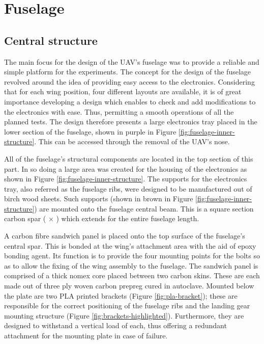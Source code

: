 \documentclass[../../main.tex]{subfiles}
\begin{document}

\section{Fuselage} \label{sec:final-design-proposal:fuselage}

\subsection{Central structure} \label{sec:final-design-proposal:fuselage:central-structure}

The main focus for the design of the UAV's fuselage was to provide a reliable and simple platform for the experiments.
The concept for the design of the fuselage revolved around the idea of providing easy access to the electronics.
Considering that for each wing position, four different layouts are available, it is of great importance developing a design which enables to check and add modifications to the electronics with ease.
Thus, permitting a smooth operations of all the planned tests.
The design therefore presents a large electronics tray placed in the lower section of the fuselage, shown in purple in Figure \ref{fig:fuselage-inner-structure}.
This can be accessed through the removal of the UAV's nose.


All of the fuselage's structural components are located in the top section of this part.
In so doing a large area was created for the housing of the electronics as shown in Figure \ref{fig:fuselage-inner-structure}.
The supports for the electronics tray, also referred as the fuselage ribs, were designed to be manufactured out of  birch wood sheets.
Such supports (shown in brown in Figure \ref{fig:fuselage-inner-structure}) are mounted onto the fuselage central beam.
This is a square section carbon spar ( $\times$ ) which extends for the entire fuselage length. 

A carbon fibre sandwich panel is placed onto the top surface of the fuselage's central spar.
This is bonded at the wing's attachment area with the aid of epoxy bonding agent.
Its function is to provide the four mounting points for the bolts so as to allow the fixing of the wing assembly to the fuselage.
The sandwich panel is comprised of a  thick nomex core placed between two carbon skins.
These are each made out of three ply woven carbon prepreg cured in autoclave.
Mounted below the plate are two PLA printed brackets (Figure \ref{fig:pla-bracket}); these are responsible for the correct positioning of the fuselage ribs and the landing gear mounting structure (Figure \ref{fig:brackets-highlighted}).
Furthermore, they are designed to withstand a vertical load of  each, thus offering a redundant attachment for the mounting plate in case of failure.
\end{document}
